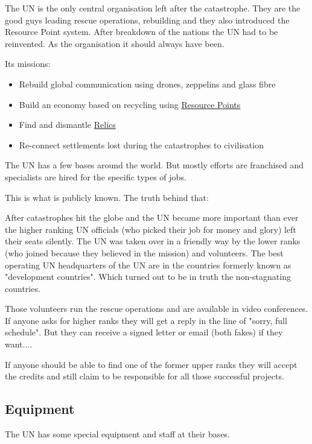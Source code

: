 The UN is the only central organisation left after the catastrophe. They are the good guys leading rescue operations, rebuilding and they also introduced the Resource Point system. After breakdown of the nations the UN had to be reinvented. As the organisation it should always have been.

Its missions:

\begin{itemize}
    \item Rebuild global communication using drones, zeppelins and glass fibre
    \item Build an economy based on recycling using \hyperref[sec:Resource Points]{Resource Points}
    \item Find and dismantle \hyperref[sec: Relic]{Relics}
    \item Re-connect settlements lost during the catastrophes to civilisation
\end{itemize}

The UN has a few bases around the world. But mostly efforts are franchised and specialists are hired for the specific types of jobs.

This is what is publicly known. The truth behind that:

After catastrophes hit the globe and the UN became more important than ever the higher ranking UN officials (who picked their job for money and glory) left their seats silently. The UN was taken over in a friendly way by the lower ranks (who joined because they believed in the mission) and volunteers. The best operating UN headquarters of the UN are in the countries formerly known as "development countries". Which turned out to be in truth the non-stagnating countries.

Those volunteers run the rescue operations and are available in video conferences. If anyone asks for higher ranks they will get a reply in the line of "sorry, full schedule". But they can receive a signed letter or email (both fakes) if they want....

If anyone should be able to find one of the former upper ranks they will accept the credits and still claim to be responsible for all those successful projects.

\subsection{Equipment}

The UN has some special equipment and staff at their bases.

